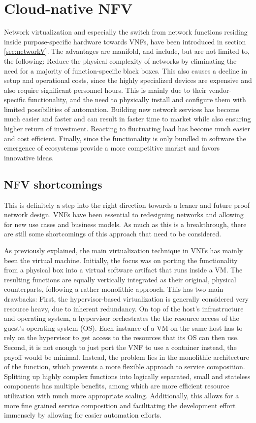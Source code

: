 \section{Cloud-native NFV}
Network virtualization and especially the switch from network functions residing inside purpose-specific hardware towards VNFs, have been introduced in section \ref{sec:networkV}. The advantages are manifold, and include, but are not limited to, the following: Reduce the physical complexity of networks by eliminating the need for a majority of function-specific black boxes. This also causes a decline in setup and operational costs, since the highly specialized devices are expensive and also require significant personnel hours. This is mainly due to their vendor-specific functionality, and the need to physically install and configure them with limited possibilities of automation. Building new network services has become much easier and faster and can result in faster time to market while also ensuring higher return of investment. Reacting to fluctuating load has become much easier and cost efficient. Finally, since the functionality is only bundled in software the emergence of ecosystems provide a more competitive market and favors innovative ideas.

\subsection{NFV shortcomings}
This is definitely a step into the right direction towards a leaner and future proof network design. VNFs have been essential to redesigning networks and allowing for new use cases and business models. As much as this is a breakthrough, there are still some shortcomings of this approach that need to be considered. 

As previously explained, the main virtualization technique in VNFs has mainly been the virtual machine. Initially, the focus was on porting the functionality from a physical box into a virtual software artifact that runs inside a VM. The resulting functions are equally vertically integrated as their original, physical counterparts, following a rather monolithic approach. This has two main drawbacks:
First, the hypervisor-based virtualization is generally considered very resource heavy, due to inherent redundancy. On top of the host's infrastructure and operating system, a hypervisor orchestrates the the resource access of the guest's operating system (OS). Each instance of a VM on the same host has to rely on the hypervisor to get access to the resources that its OS can then use. 
Second, it is not enough to just port the VNF to use a container instead, the payoff would be minimal. Instead, the problem lies in the monolithic architecture of the function, which prevents a more flexible approach to service composition. Splitting up highly complex functions into logically separated, small and stateless components has multiple benefits, among which are more efficient resource utilization with much more appropriate scaling. Additionally, this allows for a more fine grained service composition and facilitating the development effort immensely by allowing for easier automation efforts. 

